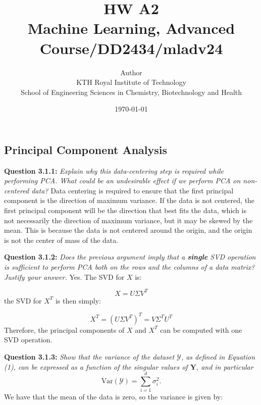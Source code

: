 \documentclass{article}
\title{HW A2\\\Large{Machine Learning, Advanced Course/DD2434/mladv24}}
\author{Author \\ KTH Royal Institute of Technology\\ School of Engineering Sciences in Chemistry, Biotechnology and Health}
\date{\today}
\begin{document}
\maketitle

\fancyfoot[C]{\thepage}
\begin{multicols}{2}

    \section{Principal Component Analysis}

    \noindent \textbf{Question 3.1.1:}  
    \textit{Explain why this data-centering step is required while performing PCA. What could be an undesirable effect if we perform PCA on non-centered data?}  
    Data centering is required to ensure that the first principal component is the direction of maximum variance. If the data is not centered, 
    the first principal component will be the direction that best fits the data, which is not necessarily the direction of maximum variance, but it may be 
    skewed by the mean.
    This is because the data is not centered around the origin, and the origin is not the center of mass of the data. 

    \noindent \textbf{Question 3.1.2:}  
    \textit{Does the previous argument imply that a \textbf{single} SVD operation is sufficient to perform PCA both on the rows and the columns of a data matrix? Justify your answer.}  
    Yes. The SVD for $X$ is:

    \begin{equation*}
        X = U \Sigma V^T
    \end{equation*}
    the SVD for $X^T$ is then simply:

    \begin{equation*}
        X^T = (U \Sigma V^T)^T = V \Sigma^T U^T
    \end{equation*}
    Therefore, the principal components of $X$ and $X^T$ can be computed with one SVD operation.
    \vspace{0.5cm}

    \noindent \textbf{Question 3.1.3:}  
    \textit{Show that the variance of the dataset \( \mathcal{Y} \), as defined in Equation (1), can be expressed as a function of the singular values of \( \mathbf{Y} \), and in particular}  
    \[
    \text{Var}(\mathcal{Y}) = \sum_{i=1}^d \sigma_i^2.
    \]
    We have that the mean of the data is zero, so the variance is given by:


\end{multicols}
\end{document}
